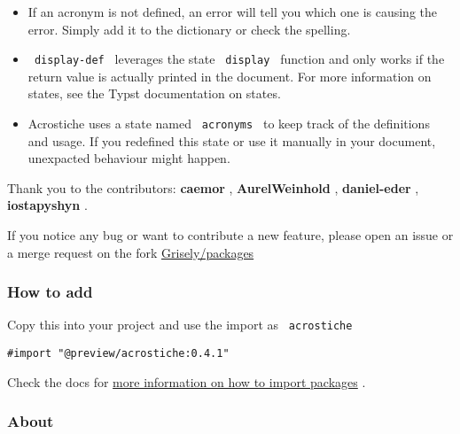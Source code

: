 \begin{itemize}
\tightlist
\item
  If an acronym is not defined, an error will tell you which one is
  causing the error. Simply add it to the dictionary or check the
  spelling.
\item
  \texttt{\ display-def\ } leverages the state \texttt{\ display\ }
  function and only works if the return value is actually printed in the
  document. For more information on states, see the Typst documentation
  on states.
\item
  Acrostiche uses a state named \texttt{\ acronyms\ } to keep track of
  the definitions and usage. If you redefined this state or use it
  manually in your document, unexpacted behaviour might happen.
\end{itemize}

Thank you to the contributors: \textbf{caemor} , \textbf{AurelWeinhold}
, \textbf{daniel-eder} , \textbf{iostapyshyn} .

If you notice any bug or want to contribute a new feature, please open
an issue or a merge request on the fork
\href{https://github.com/Grisely/packages}{Grisely/packages}

\subsubsection{How to add}\label{how-to-add}

Copy this into your project and use the import as
\texttt{\ acrostiche\ }

\begin{verbatim}
#import "@preview/acrostiche:0.4.1"
\end{verbatim}



Check the docs for
\href{https://typst.app/docs/reference/scripting/\#packages}{more
information on how to import packages} .

\subsubsection{About}\label{about}

